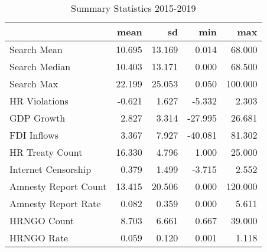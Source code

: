 \begin{table}[ht]
\centering
\begin{tabular}{|l|rrrr|}
  \hline
 & mean & sd & min & max \\ 
  \hline
Search Mean & 10.695 & 13.169 & 0.014 & 68.000 \\ 
  Search Median & 10.403 & 13.171 & 0.000 & 68.500 \\ 
  Search Max & 22.199 & 25.053 & 0.050 & 100.000 \\ 
  HR Violations & -0.621 & 1.627 & -5.332 & 2.303 \\ 
  GDP Growth & 2.827 & 3.314 & -27.995 & 26.681 \\ 
  FDI Inflows & 3.367 & 7.927 & -40.081 & 81.302 \\ 
  HR Treaty Count & 16.330 & 4.796 & 1.000 & 25.000 \\ 
  Internet Censorship & 0.379 & 1.499 & -3.715 & 2.552 \\ 
  Amnesty Report Count & 13.415 & 20.506 & 0.000 & 120.000 \\ 
  Amnesty Report Rate & 0.082 & 0.359 & 0.000 & 5.611 \\ 
  HRNGO Count & 8.703 & 6.661 & 0.667 & 39.000 \\ 
  HRNGO Rate & 0.059 & 0.120 & 0.001 & 1.118 \\ 
   \hline
\end{tabular}
\caption{Summary Statistics 2015-2019} 
\end{table}
